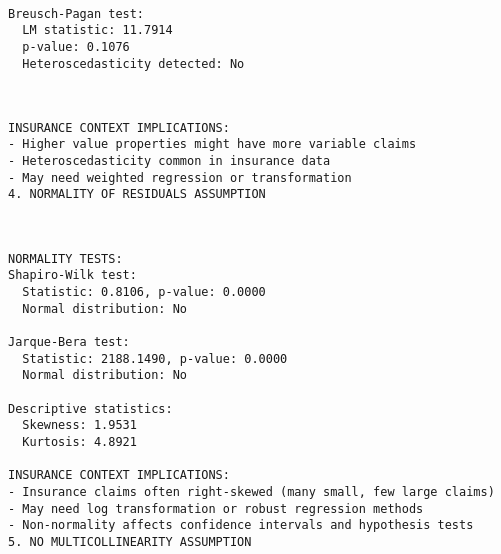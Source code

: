 \documentclass[8pt, twocolumn]{extarticle}
\begin{document}
    \begin{center}
    \end{center}
    { \hspace*{\fill} \\}
    \begin{Verbatim}[commandchars=\\\{\}]
Breusch-Pagan test:
  LM statistic: 11.7914
  p-value: 0.1076
  Heteroscedasticity detected: No
    \end{Verbatim}
    \begin{center}
    \end{center}
    { \hspace*{\fill} \\}
    \begin{Verbatim}[commandchars=\\\{\}]
INSURANCE CONTEXT IMPLICATIONS:
- Higher value properties might have more variable claims
- Heteroscedasticity common in insurance data
- May need weighted regression or transformation
4. NORMALITY OF RESIDUALS ASSUMPTION
    \end{Verbatim}
    \begin{center}
    \end{center}
    { \hspace*{\fill} \\}
    \begin{Verbatim}[commandchars=\\\{\}]
NORMALITY TESTS:
Shapiro-Wilk test:
  Statistic: 0.8106, p-value: 0.0000
  Normal distribution: No

Jarque-Bera test:
  Statistic: 2188.1490, p-value: 0.0000
  Normal distribution: No

Descriptive statistics:
  Skewness: 1.9531
  Kurtosis: 4.8921

INSURANCE CONTEXT IMPLICATIONS:
- Insurance claims often right-skewed (many small, few large claims)
- May need log transformation or robust regression methods
- Non-normality affects confidence intervals and hypothesis tests
5. NO MULTICOLLINEARITY ASSUMPTION
    \end{Verbatim}
    \begin{center}
    \end{center}
\end{document}
